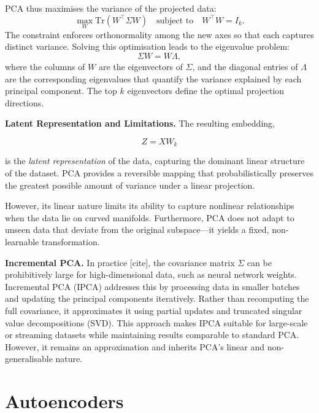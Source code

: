 PCA thus maximises the variance of the projected data:
\[
\max_{W} \text{Tr}(W^\top \Sigma W)
\quad \text{subject to} \quad W^\top W = I_k.
\]
The constraint enforces orthonormality among the new axes so that each captures distinct variance. Solving this optimisation leads to the eigenvalue problem:
\[
\Sigma W = W \Lambda,
\]
where the columns of \( W \) are the eigenvectors of \( \Sigma \), and the diagonal entries of \( \Lambda \) are the corresponding eigenvalues that quantify the variance explained by each principal component. The top \( k \) eigenvectors define the optimal projection directions.

\vspace{0.5em}
\noindent
\textbf{Latent Representation and Limitations.}
The resulting embedding,

\begin{equation}
    Z = X W_k
  \label{eq:pca}
\end{equation}

is the \textit{latent representation} of the data, capturing the dominant linear structure of the dataset.  
PCA provides a reversible mapping that probabilistically preserves the greatest possible amount of variance under a linear projection. 

However, its linear nature limits its ability to capture nonlinear relationships when the data lie on curved manifolds. Furthermore, PCA does not adapt to unseen data that deviate from the original subspace—it yields a fixed, non-learnable transformation.

\vspace{0.5em}
\noindent
\textbf{Incremental PCA.}
In practice [cite], the covariance matrix \( \Sigma \) can be prohibitively large for high-dimensional data, such as neural network weights. Incremental PCA (IPCA) addresses this by processing data in smaller batches and updating the principal components iteratively. Rather than recomputing the full covariance, it approximates it using partial updates and truncated singular value decompositions (SVD).  
This approach makes IPCA suitable for large-scale or streaming datasets while maintaining results comparable to standard PCA. However, it remains an approximation and inherits PCA’s linear and non-generalisable nature.

\section{Autoencoders}
\label{sec:autoencoders}

